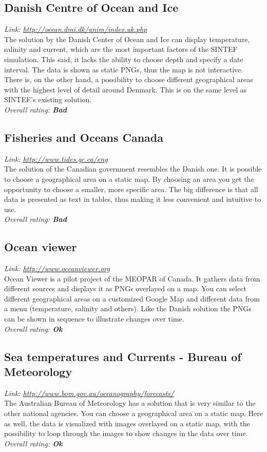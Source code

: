 \documentclass[11pt,a4paper,titlepage,oneside]{report}
\begin{document}
\subsection{Danish Centre of Ocean and Ice}
  \emph{Link: \url{http://ocean.dmi.dk/anim/index.uk.php }} \\%
    The solution by the Danish Center of Ocean and Ice can display temperature, salinity and current, which are the most important factors of the SINTEF simulation. This said, it lacks the ability to choose depth and specify a date interval. The data is shown as static PNGs, thus the map is not interactive. There is, on the other hand, a possibility to choose different geographical areas with the highest level of detail around Denmark. This is on the same level as SINTEF's existing solution.
  \\ \emph{Overall rating: \textbf{Bad}}

  \subsection{Fisheries and Oceans Canada}
  \emph{Link: \url{http://www.tides.gc.ca/eng}} \\%
    The solution of the Canadian government resembles the Danish one. It is possible to choose a geographical area on a static map. By choosing an area you get the opportunity to choose a smaller, more specific area. The big difference is that all data is presented as text in tables, thus making it less convenient and intuitive to use.
  \\ \emph{Overall rating: \textbf{Bad}}

  \subsection{Ocean viewer}
  \emph{Link: \url{http://www.oceanviewer.org}} \\%
    Ocean Viewer is a pilot project of the \gls{MEOPAR} of Canada. It gathers data from different sources and displays it as PNGs overlayed on a map. You can select different geographical areas on a customized Google Map and different data from a menu (temperature, salinity and others). Like the Danish solution the PNGs can be shown in sequence to illustrate changes over time.
  \\ \emph{Overall rating: \textbf{Ok}}

  \subsection{Sea temperatures and Currents - Bureau of Meteorology}
  \emph{Link: \url{http://www.bom.gov.au/oceanography/forecasts/}} \\%
    The Australian Bureau of Meteorology has a solution that is very similar to the other national agencies. You can choose a geographical area on a static map. Here as well, the data is visualized with images overlayed on a static map, with the possibility to loop through the images to show changes in the data over time.
  \\ \emph{Overall rating: \textbf{Ok}}
  
\end{document}
